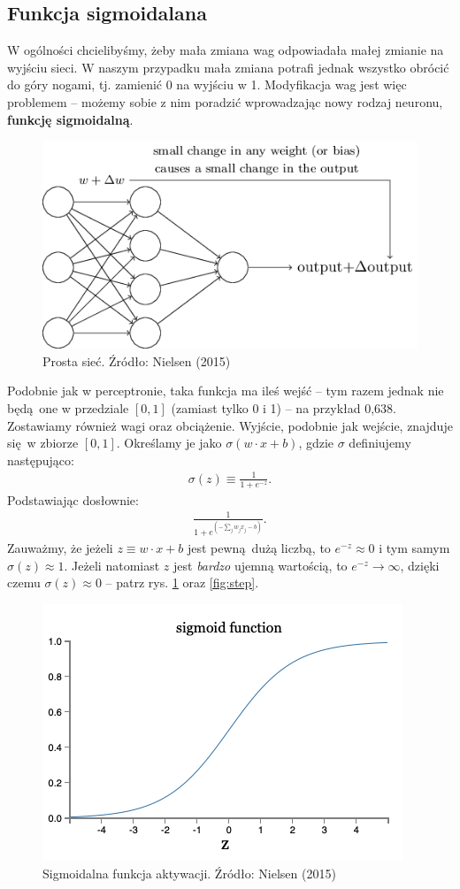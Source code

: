 \documentclass[10pt, oneside]{article}
\theoremstyle{remark}
\begin{document}
\subsection{Funkcja sigmoidalana}

W ogólności chcielibyśmy, żeby mała zmiana wag odpowiadała małej zmianie na wyjściu sieci.
W naszym przypadku mała zmiana potrafi jednak wszystko obrócić do góry nogami, tj. zamienić 0 na wyjściu w 1.
Modyfikacja wag jest więc problemem -- możemy sobie z nim poradzić wprowadzając nowy rodzaj neuronu, \textbf{funkcję sigmoidalną}.
\begin{figure}[htpb]
	\centering
	\includegraphics[width=.5\linewidth]{figures/tikz8}
	\caption{Prosta sieć. Źródło: Nielsen (2015)}
\end{figure}
Podobnie jak w perceptronie, taka funkcja ma ileś wejść -- tym razem jednak nie będą one w przedziale $[0, 1]$ (zamiast tylko 0 i 1) -- na przykład 0,638.
Zostawiamy również wagi oraz obciążenie.
Wyjście, podobnie jak wejście, znajduje się w zbiorze $[0, 1]$.
Określamy je jako $\sigma(w \cdot x+b)$, gdzie $\sigma$ definiujemy następująco:
\begin{eqnarray} 
  \sigma(z) \equiv \frac{1}{1+e^{-z}}.
\end{eqnarray}
Podstawiając dosłownie:
\begin{eqnarray} 
  \frac{1}{1+e^{\left(-\sum_j w_j x_j-b\right)}}.
\end{eqnarray}
Zauważmy, że jeżeli $z\equiv w \cdot x + b$ jest pewną dużą liczbą, to $e^{-z} \approx 0$ i tym samym $\sigma(z) \approx 1$.
Jeżeli natomiast $z$ jest \emph{bardzo} ujemną wartością, to $e^{-z} \rightarrow \infty$, dzięki czemu $\sigma(z) \approx 0$ -- patrz rys. \ref{fig:sigmoid} oraz \ref{fig:step}.
\begin{figure}[htpb]
	\centering
	\includegraphics[width=.4\linewidth]{figures/sigmoid}
	\caption{Sigmoidalna funkcja aktywacji. Źródło: Nielsen (2015)}
	\label{fig:sigmoid}
\end{figure}
\end{document}
